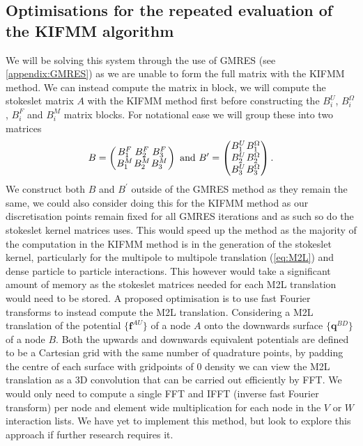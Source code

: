 \subsection{Optimisations for the repeated evaluation of the KIFMM algorithm}
We will be solving this system through the use of GMRES (see \cref{appendix:GMRES}) as we are unable to form the full matrix with the KIFMM method. We can instead compute the matrix in block, we will compute the stokeslet matrix $A$ with the KIFMM method first before constructing the $B_i^U$, $B_i^\Omega$, $B_i^F$ and $B_i^M$ matrix blocks. For notational ease we will group these into two matrices
\begin{equation*}
\arraycolsep=0.4pt\def\arraystretch{1}
B = \left( \begin{array}{ccc}
B_{1}^{F} & B_{2}^{F} & B_{3}^{F} \\
B_{1}^{M} & B_{2}^{M} & B_{3}^{M}
\end{array}\right) \text{ and }
B^\prime = \left(\begin{array}{cc}
B_{1}^{U} & B_{1}^{\Omega} \\
B_{2}^{U} & B_{2}^{\Omega} \\
B_{3}^{U} & B_{3}^{\Omega} \\
\end{array}\right).
\end{equation*} 
We construct both $B$ and $B^\prime$ outside of the GMRES method as they remain the same, we could also consider doing this for the KIFMM method as our discretisation points remain fixed for all GMRES iterations and as such so do the stokeslet kernel matrices uses. This would speed up the method as the majority of the computation in the KIFMM method is in the generation of the stokeslet kernel, particularly for the multipole to multipole translation (\cref{eq:M2L}) and dense particle to particle interactions. This however would take a significant amount of memory as the stokeslet matrices needed for each M2L translation would need to be stored. A proposed optimisation is to use fast Fourier transforms to instead compute the M2L translation. Considering a M2L translation of the potential $\{\bm{f}^{AU}\}$ of a node $A$ onto the downwards surface $\{\bm{q}^{BD}\}$ of a node $B$. Both the upwards and downwards equivalent potentials are defined to be a Cartesian grid with the same number of quadrature points, by padding the centre of each surface with gridpoints of $0$ density we can view the M2L translation as a 3D convolution \cite{Ying2004} that can be carried out efficiently by FFT. We would only need to compute a single FFT and IFFT (inverse fast Fourier transform) per node and element wide multiplication for each node in the $V$ or $W$ interaction lists. We have yet to implement this method, but look to explore this approach if further research requires it.

